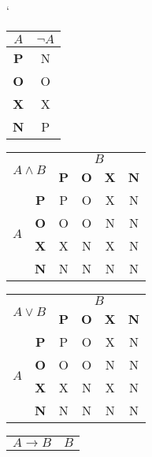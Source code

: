 \documentclass[a4paper, 11pt]{article}
\begin{document}
\begin{table} [h]
\catcode`
	\begin{center}

		
			\begin{tabular}{|c|c|} \hline
			$A$ & $\neg A$ \\ \hline
			\textbf{P} & N \\ \hline
			\textbf{O} & O \\ \hline
			\textbf{X} & X \\ \hline
			\textbf{N} & P \\ \hline
		 
		
			\end{tabular}
			\begin{tabular}{|c | c|c|c|c|c|} \hline
				\multicolumn{2}{|c}{\multirow{2}{*}{$A \wedge B$}} & \multicolumn{4}{|c|}{$B$}   \\ \cline{3-6}
				
				\multicolumn{2}{|c|}{} &  \textbf{P} & \textbf{O} & \textbf{X} & \textbf{N} \\ \hline
				\multirow{4}{*}{$A$}  & \textbf{P} & P & O & X & N\\ \cline{2-6}
				&  \textbf{O} & O & O & N & N \\ \cline{2-6}
				&  \textbf{X} & X & N & X & N \\ \cline{2-6}
				&  \textbf{N} & N & N & N & N \\ \hline
			\end{tabular}
			\begin{tabular}{|c|c|c|c|c|c|} \hline
				\multicolumn{2}{|c}{\multirow{2}{*}{$A \vee B$}} & \multicolumn{4}{|c|}{$B$}   \\ \cline{3-6}
				
				\multicolumn{2}{|c|}{} &  \textbf{P} & \textbf{O} & \textbf{X} & \textbf{N} \\ \hline
				\multirow{4}{*}{$A$}  & \textbf{P} & P & O & X & N\\ \cline{2-6}
				&  \textbf{O} & O & O & N & N \\ \cline{2-6}
				&  \textbf{X} & X & N & X & N \\ \cline{2-6}
				&  \textbf{N} & N & N & N & N \\ \hline
			\end{tabular}
			\begin{tabular}{|c|c|c|c|c|c|} \hline
				\multicolumn{2}{|c}{\multirow{2}{*}{$A \rightarrow B$}} & \multicolumn{4}{|c|}{$B$}   \\ \cline{3-6}
				

\end{tabular}
\end{center}
\end{table}
\end{document}

